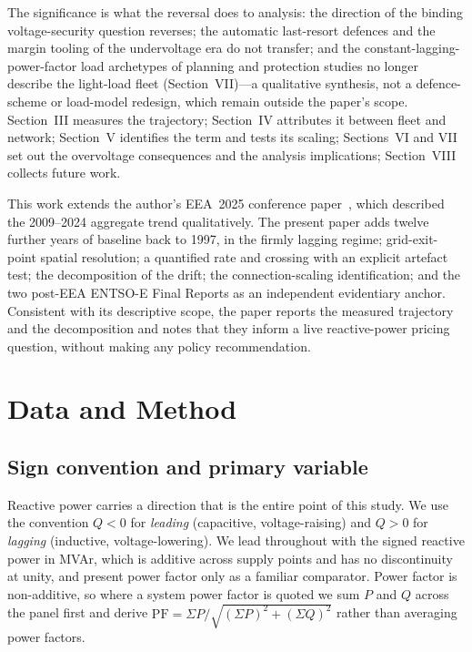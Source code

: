\documentclass[journal]{IEEEtran}
\begin{document}
The significance is what the reversal does to analysis: the direction of the
binding voltage-security question reverses; the automatic last-resort defences
and the margin tooling of the undervoltage era do not transfer; and the
constant-lagging-power-factor load archetypes of planning and protection
studies no longer describe the light-load fleet (Section~VII)---a qualitative
synthesis, not a defence-scheme or load-model redesign, which remain outside
the paper's scope. Section~III measures the trajectory; Section~IV attributes
it between fleet and network; Section~V identifies the term and tests its
scaling; Sections~VI and VII set out the overvoltage consequences and the
analysis implications; Section~VIII collects future work.

This work extends the author's EEA~2025 conference paper~\cite{hume2025}, which
described the 2009--2024 aggregate trend qualitatively. The present paper adds
twelve further years of baseline back to 1997, in the firmly lagging regime;
grid-exit-point spatial resolution; a quantified rate and crossing with an
explicit artefact test; the decomposition of the drift; the connection-scaling
identification; and the two post-EEA ENTSO-E Final Reports as an independent
evidentiary anchor. Consistent with its descriptive scope, the paper reports the
measured trajectory and the decomposition and notes that they inform a live
reactive-power pricing question, without making any policy recommendation.

\section{Data and Method}
\subsection{Sign convention and primary variable}
Reactive power carries a direction that is the entire point of this study. We use
the convention $Q<0$ for \emph{leading} (capacitive, voltage-raising) and $Q>0$
for \emph{lagging} (inductive, voltage-lowering). We lead throughout with the
signed reactive power in MVAr, which is additive across supply points and has no
discontinuity at unity, and present power factor only as a familiar comparator.
Power factor is non-additive, so where a system power factor is quoted we sum $P$
and $Q$ across the panel first and derive
$\mathrm{PF}=\Sigma P/\sqrt{(\Sigma P)^2+(\Sigma Q)^2}$ rather than averaging
power factors.
\end{document}
